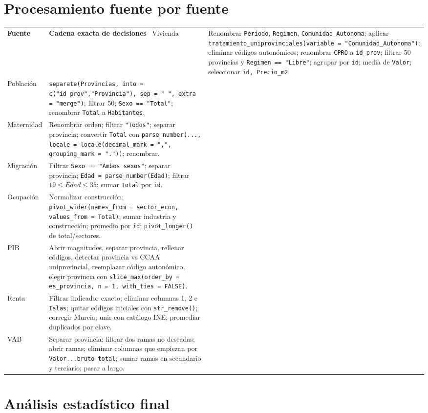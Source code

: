 \documentclass[10pt,a4paper]{article}
\newcommand{\code}[1]{\texttt{\small #1}}
\begin{document}
\section{Procesamiento fuente por fuente}
\begin{longtable}{p{}p{}}
\toprule\textbf{Fuente} & \textbf{Cadena exacta de decisiones}\
\midrule\endhead
Vivienda & Renombrar \code{Periodo}, \code{Regimen}, \code{Comunidad\_Autonoma}; aplicar \code{tratamiento\_uniprovinciales(variable = "Comunidad\_Autonoma")}; eliminar códigos autonómicos; renombrar \code{CPRO} a \code{id\_prov}; filtrar 50 provincias y \code{Regimen == "Libre"}; agrupar por \code{id}; media de \code{Valor}; seleccionar \code{id, Precio\_m2}.\\
Población & \code{separate(Provincias, into = c("id\_prov","Provincia"), sep = " ", extra = "merge")}; filtrar 50; \code{Sexo == "Total"}; renombrar \code{Total} a \code{Habitantes}.\\
Maternidad & Renombrar orden; filtrar \code{"Todos"}; separar provincia; convertir \code{Total} con \code{parse\_number(..., locale = locale(decimal\_mark = ",", grouping\_mark = "."))}; renombrar.\\
Migración & Filtrar \code{Sexo == "Ambos sexos"}; separar provincia; \code{Edad = parse\_number(Edad)}; filtrar $19\leq Edad\leq35$; sumar \code{Total} por \code{id}.\\
Ocupación & Normalizar construcción; \code{pivot\_wider(names\_from = sector\_econ, values\_from = Total)}; sumar industria y construcción; promedio por \code{id}; \code{pivot\_longer()} de total/sectores.\\
PIB & Abrir magnitudes, separar provincia, rellenar códigos, detectar provincia vs CCAA uniprovincial, reemplazar código autonómico, elegir provincia con \code{slice\_max(order\_by = es\_provincia, n = 1, with\_ties = FALSE)}.\\
Renta & Filtrar indicador exacto; eliminar columnas 1, 2 e \code{Islas}; quitar códigos iniciales con \code{str\_remove()}; corregir Murcia; unir con catálogo INE; promediar duplicados por clave.\\
VAB & Separar provincia; filtrar dos ramas no deseadas; abrir ramas; eliminar columnas que empiezan por \code{Valor...bruto total}; sumar ramas en secundario y terciario; pasar a largo.\\
\bottomrule\end{longtable}

\section{Análisis estadístico final}
\end{document}
